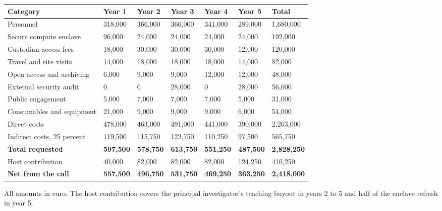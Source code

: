 \begin{center}
\small
\setlength{\tabcolsep}{3.5pt}
\begin{tabular}{@{}l R{1.55cm} R{1.55cm} R{1.55cm} R{1.55cm} R{1.55cm} R{1.85cm}@{}}
  \toprule
  Category & Year 1 & Year 2 & Year 3 & Year 4 & Year 5 & Total \\
  \midrule
  Personnel                  & 318{,}000 & 366{,}000 & 366{,}000 & 341{,}000 & 289{,}000 & 1{,}680{,}000 \\
  Secure compute enclave     & 96{,}000  & 24{,}000  & 24{,}000  & 24{,}000  & 24{,}000  & 192{,}000 \\
  Custodian access fees      & 18{,}000  & 30{,}000  & 30{,}000  & 30{,}000  & 12{,}000  & 120{,}000 \\
  Travel and site visits     & 14{,}000  & 18{,}000  & 18{,}000  & 18{,}000  & 14{,}000  & 82{,}000 \\
  Open access and archiving   & 6{,}000   & 9{,}000   & 9{,}000   & 12{,}000  & 12{,}000  & 48{,}000 \\
  External security audit    & 0         & 0         & 28{,}000  & 0         & 28{,}000  & 56{,}000 \\
  Public engagement          & 5{,}000   & 7{,}000   & 7{,}000   & 7{,}000   & 5{,}000   & 31{,}000 \\
  Consumables and equipment  & 21{,}000  & 9{,}000   & 9{,}000   & 9{,}000   & 6{,}000   & 54{,}000 \\
  \midrule
  Direct costs               & 478{,}000 & 463{,}000 & 491{,}000 & 441{,}000 & 390{,}000 & 2{,}263{,}000 \\
  Indirect costs, 25 percent & 119{,}500 & 115{,}750 & 122{,}750 & 110{,}250 & 97{,}500 & 565{,}750 \\
  \midrule
  \textbf{Total requested}   & \textbf{597{,}500} & \textbf{578{,}750} & \textbf{613{,}750} & \textbf{551{,}250} & \textbf{487{,}500} & \textbf{2{,}828{,}250} \\
  \midrule
  Host contribution          & 40{,}000  & 82{,}000  & 82{,}000  & 82{,}000  & 124{,}250 & 410{,}250 \\
  \textbf{Net from the call} & \textbf{557{,}500} & \textbf{496{,}750} & \textbf{531{,}750} & \textbf{469{,}250} & \textbf{363{,}250} & \textbf{2{,}418{,}000} \\
  \bottomrule
\end{tabular}
\end{center}

\vspace{4pt}
\noindent
{\small All amounts in euro. The host contribution covers the principal investigator's teaching
buyout in years 2 to 5 and half of the enclave refresh in year 5.}

